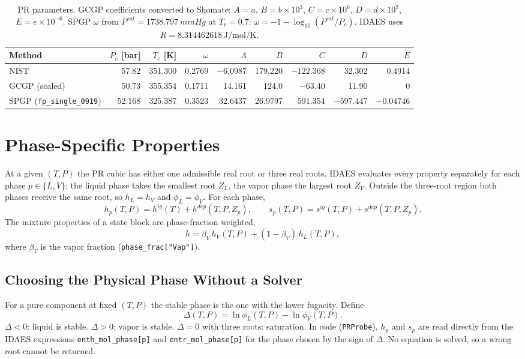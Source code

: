 \documentclass{article}
\begin{document}
\begin{table}[h]
\centering
\begin{tabular}{lrrrrrrrr}
\toprule
Method & $P_c$ [bar] & $T_c$ [K] & $\omega$ & $A$ & $B$ & $C$ & $D$ & $E$ \\
\midrule
NIST & 57.82 & 351.300 & 0.2769 & $-6.0987$ & 179.220 & $-122.368$ & 32.302 & 0.4914 \\
GCGP (scaled) & 50.73 & 355.354 & 0.1711 & 14.161 & 124.0 & $-63.40$ & 11.90 & 0 \\
SPGP (\texttt{fp\_single\_0919}) & 52.168 & 325.387 & 0.3523 & 32.6437 & 26.9797 & 591.354 & $-597.447$ & $-0.04746$ \\
\bottomrule
\end{tabular}
\caption{PR parameters. GCGP coefficients converted to Shomate: $A=a$,
$B=b\times10^3$, $C=c\times10^6$, $D=d\times10^9$, $E=e\times10^{-6}$.
SPGP $\omega$ from $P^{sat}=\SI{1738.797}{mmHg}$ at $T_r=0.7$:
$\omega = -1-\log_{10}(P^{sat}/P_c)$. IDAES uses $R=\SI{8.314462618}{\joule\per\mole\per\kelvin}$.}
\end{table}

\section{Phase-Specific Properties}
At a given $(T,P)$ the PR cubic has either one admissible real root or three
real roots. IDAES evaluates every property separately for each phase $p\in\{L,V\}$:
the liquid phase takes the smallest root $Z_L$, the vapor phase the largest
root $Z_V$. Outside the three-root region both phases receive the same root,
so $h_L = h_V$ and $\phi_L = \phi_V$. For each phase,
\begin{equation}
h_p(T,P) = h^{ig}(T) + h^{dep}(T,P,Z_p), \qquad
s_p(T,P) = s^{ig}(T,P) + s^{dep}(T,P,Z_p).
\end{equation}
The mixture properties of a state block are phase-fraction weighted,
\begin{equation}\label{eq:mix}
h = \beta_V\, h_V(T,P) + (1-\beta_V)\, h_L(T,P),
\end{equation}
where $\beta_V$ is the vapor fraction (\texttt{phase\_frac["Vap"]}).

\subsection{Choosing the Physical Phase Without a Solver}
For a pure component at fixed $(T,P)$ the stable phase is the one with the
lower fugacity. Define
\begin{equation}
\Delta(T,P) = \ln\phi_L(T,P) - \ln\phi_V(T,P).
\end{equation}
$\Delta < 0$: liquid is stable. $\Delta > 0$: vapor is stable. $\Delta = 0$ with
three roots: saturation. In code (\texttt{PRProbe}), $h_p$ and $s_p$ are read directly
from the IDAES expressions \texttt{enth\_mol\_phase[p]} and
\texttt{entr\_mol\_phase[p]} for the phase chosen by the sign of $\Delta$.
No equation is solved, so a wrong root cannot be returned.
\end{document}
